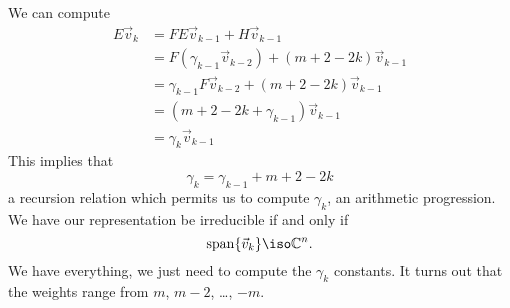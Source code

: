 We can compute
\begin{subequations}
\begin{align}
E\vec{v}_{k} &= FE\vec{v}_{k-1}+H\vec{v}_{k-1}\\
&= F(\gamma_{k-1}\vec{v}_{k-2})+(m+2-2k)\vec{v}_{k-1}\\
&= \gamma_{k-1}F\vec{v}_{k-2}+(m+2-2k)\vec{v}_{k-1}\\
&= (m+2-2k+\gamma_{k-1})\vec{v}_{k-1}\\
&= \gamma_{k}\vec{v}_{k-1}
\end{align}
\end{subequations}
This implies that
\begin{equation}
\gamma_{k}=\gamma_{k-1}+m+2-2k
\end{equation}
a recursion relation which permits us to compute $\gamma_{k}$, an
arithmetic progression. We have our representation be
irreducible if and only if
\begin{equation}
{\rm span}\{\vec{v}_{k}\}\iso\Bbb{C}^{n}.
\end{equation}
We have everything, we just need to compute the $\gamma_{k}$
constants. It turns out that the weights range from $m$, $m-2$,
\dots, $-m$.
